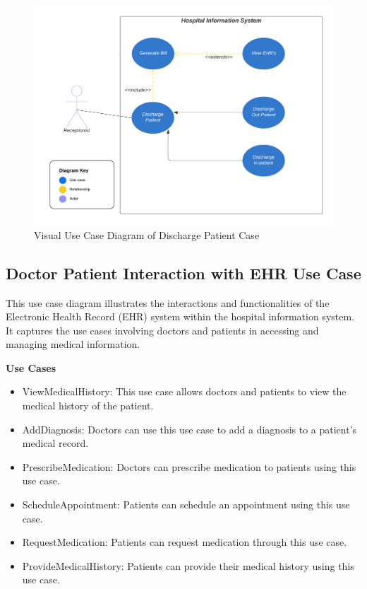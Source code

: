 \begin{figure}[!htb]
\begin{center}\includegraphics[width=12cm]{src/pic/Diagrams/Dischage_Patient_UCD.png}\end{center}
\caption{Visual Use Case Diagram of Discharge Patient Case}
\label{DPUCD}
\end{figure}


\subsection{Doctor Patient Interaction with EHR Use Case}

This use case diagram illustrates the interactions and functionalities of the Electronic Health Record (EHR) system within the hospital information system. It captures the use cases involving doctors and patients in accessing and managing medical information.

\textbf{Use Cases}
\begin{itemize}
    \item ViewMedicalHistory: This use case allows doctors and patients to view the medical history of the patient.
    \item AddDiagnosis: Doctors can use this use case to add a diagnosis to a patient's medical record.
    \item PrescribeMedication: Doctors can prescribe medication to patients using this use case.
    \item ScheduleAppointment: Patients can schedule an appointment using this use case.
    \item RequestMedication: Patients can request medication through this use case.
    \item ProvideMedicalHistory: Patients can provide their medical history using this use case.
\end{itemize}

